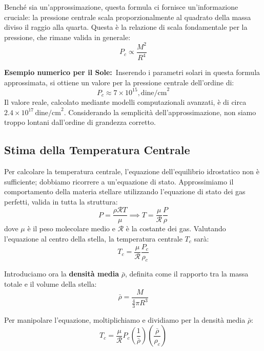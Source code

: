 Benché sia un'approssimazione, questa formula ci fornisce un'informazione cruciale: la pressione centrale scala proporzionalmente al quadrato della massa diviso il raggio alla quarta. Questa è la relazione di scala fondamentale per la pressione, che rimane valida in generale:
\begin{equation}
P_c \propto \frac{M^2}{R^4}
\end{equation}

\textbf{Esempio numerico per il Sole:}\
Inserendo i parametri solari in questa formula approssimata, si ottiene un valore per la pressione centrale dell'ordine di:
\begin{equation}
P_c \approx 7 \times 10^{15} , \text{dine/cm}^2
\end{equation}
Il valore reale, calcolato mediante modelli computazionali avanzati, è di circa $2.4 \times 10^{17} \, \text{dine/cm}^2$. Considerando la semplicità dell'approssimazione, non siamo troppo lontani dall'ordine di grandezza corretto.

\subsection{Stima della Temperatura Centrale}

Per calcolare la temperatura centrale, l'equazione dell'equilibrio idrostatico non è sufficiente; dobbiamo ricorrere a un'equazione di stato. Approssimiamo il comportamento della materia stellare utilizzando l'equazione di stato dei gas perfetti, valida in tutta la struttura:
\begin{equation}
P = \frac{\rho \mathcal{R} T}{\mu} \implies T = \frac{\mu}{\mathcal{R}} \frac{P}{\rho}
\end{equation}
dove $\mu$ è il peso molecolare medio e $\mathcal{R}$ è la costante dei gas.
Valutando l'equazione al centro della stella, la temperatura centrale $T_c$ sarà:
\begin{equation}
T_c = \frac{\mu}{\mathcal{R}} \frac{P_c}{\rho_c}
\end{equation}

Introduciamo ora la \textbf{densità media} $\bar{\rho}$, definita come il rapporto tra la massa totale e il volume della stella:
\begin{equation}
\bar{\rho} = \frac{M}{\frac{4}{3}\pi R^3}
\end{equation}

Per manipolare l'equazione, moltiplichiamo e dividiamo per la densità media $\bar{\rho}$:
\begin{equation}
T_c = \frac{\mu}{\mathcal{R}} P_c \left(\frac{1}{\bar{\rho}}\right) \left(\frac{\bar{\rho}}{\rho_c}\right)
\end{equation}

